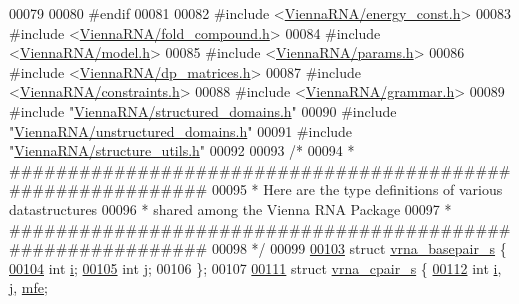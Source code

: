 \begin{DoxyCode}
00079 
00080 \textcolor{preprocessor}{#endif}
00081 
00082 \textcolor{preprocessor}{#include <\mbox{\hyperlink{energy__const_8h}{ViennaRNA/energy\_const.h}}>}
00083 \textcolor{preprocessor}{#include <\mbox{\hyperlink{fold__compound_8h}{ViennaRNA/fold\_compound.h}}>}
00084 \textcolor{preprocessor}{#include <\mbox{\hyperlink{model_8h}{ViennaRNA/model.h}}>}
00085 \textcolor{preprocessor}{#include <\mbox{\hyperlink{params_8h}{ViennaRNA/params.h}}>}
00086 \textcolor{preprocessor}{#include <\mbox{\hyperlink{dp__matrices_8h}{ViennaRNA/dp\_matrices.h}}>}
00087 \textcolor{preprocessor}{#include <\mbox{\hyperlink{constraints_8h}{ViennaRNA/constraints.h}}>}
00088 \textcolor{preprocessor}{#include <\mbox{\hyperlink{grammar_8h}{ViennaRNA/grammar.h}}>}
00089 \textcolor{preprocessor}{#include "\mbox{\hyperlink{structured__domains_8h}{ViennaRNA/structured\_domains.h}}"}
00090 \textcolor{preprocessor}{#include "\mbox{\hyperlink{unstructured__domains_8h}{ViennaRNA/unstructured\_domains.h}}"}
00091 \textcolor{preprocessor}{#include "\mbox{\hyperlink{structure__utils_8h}{ViennaRNA/structure\_utils.h}}"}
00092 
00093 \textcolor{comment}{/*}
00094 \textcolor{comment}{ * ############################################################}
00095 \textcolor{comment}{ * Here are the type definitions of various datastructures}
00096 \textcolor{comment}{ * shared among the Vienna RNA Package}
00097 \textcolor{comment}{ * ############################################################}
00098 \textcolor{comment}{ */}
00099 
\mbox{\hyperlink{group__data__structures}{00103}} \textcolor{keyword}{struct }\mbox{\hyperlink{group__data__structures_structvrna__basepair__s}{vrna\_basepair\_s}} \{
\mbox{\hyperlink{group__data__structures_a82125b82685ad70eb6a30702a401eaa6}{00104}}   \textcolor{keywordtype}{int} \mbox{\hyperlink{group__data__structures_a82125b82685ad70eb6a30702a401eaa6}{i}};
\mbox{\hyperlink{group__data__structures_af4cfcd99d33a7bd331af05163261495a}{00105}}   \textcolor{keywordtype}{int} \mbox{\hyperlink{group__data__structures_af4cfcd99d33a7bd331af05163261495a}{j}};
00106 \};
00107 
\mbox{\hyperlink{group__data__structures}{00111}} \textcolor{keyword}{struct }\mbox{\hyperlink{group__data__structures_structvrna__cpair__s}{vrna\_cpair\_s}} \{
\mbox{\hyperlink{group__data__structures_a860b83ecd770e2e400e03c8042ab6dc4}{00112}}   \textcolor{keywordtype}{int}   \mbox{\hyperlink{group__data__structures_a2c3a7560376e8cf5caf5d978b59ecbc5}{i}}, \mbox{\hyperlink{group__data__structures_a7dcb24ba978ed288002693416c920028}{j}}, \mbox{\hyperlink{group__data__structures_a860b83ecd770e2e400e03c8042ab6dc4}{mfe}};

\end{DoxyCode}
